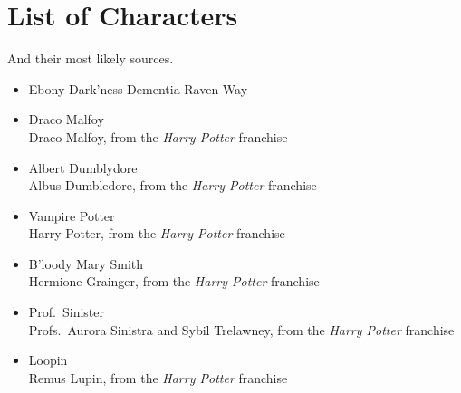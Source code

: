 \cleardoublepage\chapter{List of Characters}

And their most likely sources.

\begin{itemize}
	\item Ebony Dark'ness Dementia Raven Way
	\item Draco Malfoy\\
			{\small Draco Malfoy, from the \emph{Harry Potter} franchise}
	\item Albert Dumblydore\\
			{\small Albus Dumbledore, from the \emph{Harry Potter} franchise}
	\item Vampire Potter\\
			{\small Harry Potter, from the \emph{Harry Potter} franchise}
	\item B'loody Mary Smith\\
			{\small Hermione Grainger, from the \emph{Harry Potter} franchise}
	\item Prof.~Sinister\\
			{\small Profs.~Aurora Sinistra and Sybil Trelawney, from the \emph{Harry Potter} franchise}
	\item Loopin\\
			{\small Remus Lupin, from the \emph{Harry Potter} franchise}
\end{itemize}
